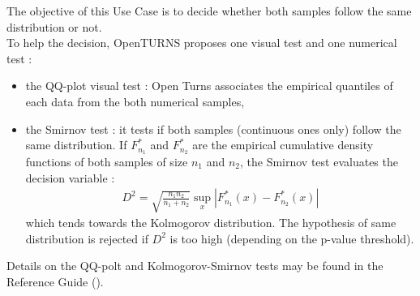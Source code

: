 \renewcommand{\filename}{docUC_InputWithData_TestSameDist.tex}
\renewcommand{\filetitle}{UC : Do two samples have the same distribution : QQ-plot visual test, Smirnov numerical test}

\HeaderIIILevel




The objective of this Use Case is to decide whether both samples follow the same distribution or not. \\

To help the decision, OpenTURNS  proposes one visual test and one numerical test :
\begin{itemize}
\item the QQ-plot visual test : Open Turns associates the empirical quantiles of each data from the both numerical samples,

\item the Smirnov test : it tests if both samples (continuous ones only) follow the same distribution. If $F_{n_1}^{*}$ and $F_{n_2}^{*}$ are the empirical cumulative density functions of both samples of size $n_1$ and $n_2$, the Smirnov test evaluates the decision variable :
  \begin{align*}
    D^2 = \displaystyle \sqrt{\frac{n_1n_2}{n_1+n_2}} \sup_{x}|F_{n_1}^{*}(x) - F_{n_2}^{*}(x)|
  \end{align*}
  which tends towards the Kolmogorov distribution. The hypothesis of same distribution is rejected if $D^2$ is too high (depending on the p-value threshold).
\end{itemize}



Details on the QQ-polt and Kolmogorov-Smirnov  tests may be found in the Reference Guide ().\\


